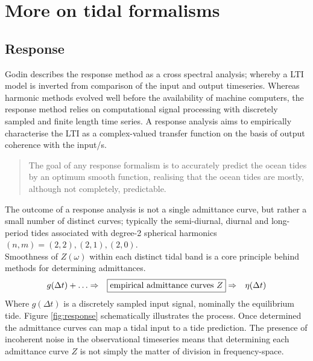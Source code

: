 \chapter{More on tidal formalisms}
\label{appendix:tideFormalisms}
\section{Response}
Godin \citep{Godin:1991vx} describes the response method as a cross spectral analysis; whereby a LTI model is inverted from comparison of the input and output timeseries.   
Whereas harmonic methods evolved well before the availability of machine computers, the response method relies on computational signal processing with discretely sampled and finite length time series.
A response analysis aims to empirically characterise the LTI as a complex-valued transfer function on the basis of output coherence with the input/s. 
\begin{quotation}
The goal of any response formalism is to accurately predict the ocean tides by an optimum smooth function, realising that the ocean tides are mostly, although not completely, predictable.
\end{quotation}
The outcome of a response analysis is not a single admittance curve, but rather a small number of distinct curves; typically the semi-diurnal, diurnal and long-period tides associated with degree-2 spherical harmonics $(n,m)=(2,2),(2,1),(2,0)$.\\
Smoothness of $Z(\omega)$ within each distinct tidal band is a core principle behind methods for determining admittances.  
\begin{align}
    \label{E:response}
    g(\Delta t) + \dots &\Rightarrow & \fbox{empirical admittance curves $Z$} &\Rightarrow & \mbox{$\eta(\Delta t)$}  %
\end{align}
Where $g(\Delta t)$ is a discretely sampled input signal, nominally the equilibrium tide.   Figure \ref{fig:response} schematically illustrates the process.
Once determined the admittance curves can map a tidal input to a tide prediction.
The presence of incoherent noise in the observational timeseries means that determining each admittance curve $Z$ is not simply the matter of division in frequency-space.


